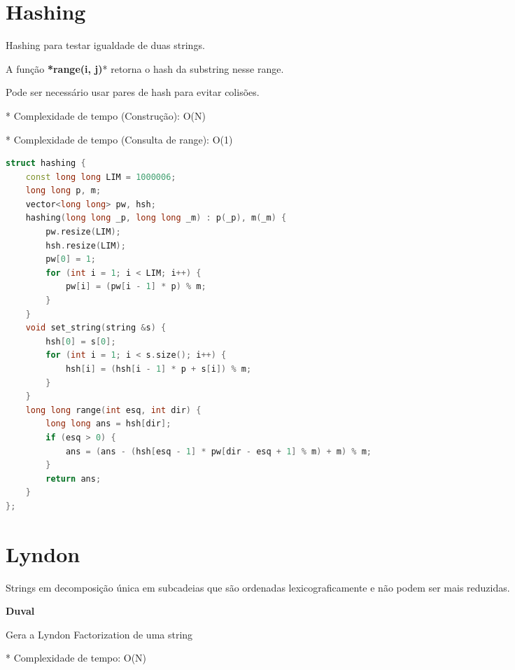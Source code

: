 \documentclass[11pt, a4paper, oneside]{book}
\begin{document}
\hfill

\section{Hashing}


Hashing para testar igualdade de duas strings.



A função \textbf{*range(i, j)}* retorna o hash da substring nesse range.   

Pode ser necessário usar pares de hash para evitar colisões.



* Complexidade de tempo (Construção): O(N)

* Complexidade de tempo (Consulta de range): O(1)

\hfill

\begin{multicols}{2}
\begin{lstlisting}[language=C++]
struct hashing {
    const long long LIM = 1000006;
    long long p, m;
    vector<long long> pw, hsh;
    hashing(long long _p, long long _m) : p(_p), m(_m) {
        pw.resize(LIM);
        hsh.resize(LIM);
        pw[0] = 1;
        for (int i = 1; i < LIM; i++) {
            pw[i] = (pw[i - 1] * p) % m;
        }
    }
    void set_string(string &s) {
        hsh[0] = s[0];
        for (int i = 1; i < s.size(); i++) {
            hsh[i] = (hsh[i - 1] * p + s[i]) % m;
        }
    }
    long long range(int esq, int dir) {
        long long ans = hsh[dir];
        if (esq > 0) {
            ans = (ans - (hsh[esq - 1] * pw[dir - esq + 1] % m) + m) % m;
        }
        return ans;
    }
};
\end{lstlisting}
\end{multicols}

\hfill

\section{Lyndon}


Strings em decomposição única em subcadeias que são ordenadas lexicograficamente e não podem ser mais reduzidas.



\textbf{Duval} 



Gera a Lyndon Factorization de uma string



* Complexidade de tempo: O(N)
\end{document}
